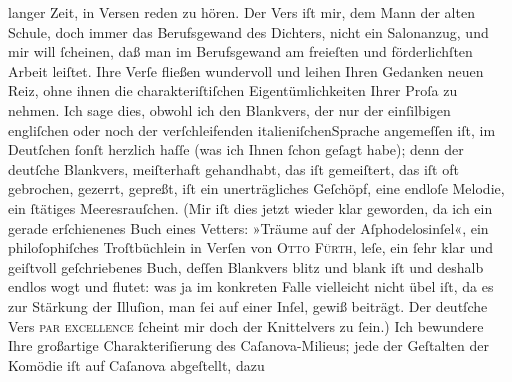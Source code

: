 \begin{ledgroupsized}[t]{13cm}
               langer Zeit, in Versen reden zu hören. Der Vers iſt mir, dem Mann der alten Schule,
               doch immer das Berufsgewand des Dichters, nicht ein Salonanzug, und mir will
               ſcheinen, daß man im Berufsgewand am freieſten und förderlichſten Arbeit leiſtet.
               Ihre Verſe fließen wundervoll und leihen Ihren Gedanken neuen Reiz, ohne ihnen die
               charakteriſtiſchen Eigentümlichkeiten Ihrer Proſa zu nehmen. Ich sage dies, obwohl
               ich den Blankvers, der nur der einſilbigen engliſchen oder noch der verſchleifenden italieniſchenSprache angemeſſen iſt, im Deutſchen ſonſt herzlich
               haſſe (was ich Ihnen ſchon geſagt habe); denn der deutſche Blankvers, mei{\pb}ſterhaft gehandhabt, das iſt gemeiſtert,
               das iſt oft gebrochen, gezerrt, gepreßt, iſt ein unerträgliches Geſchöpf, eine
               endloſe Melodie, ein ſtätiges Meeresrauſchen. (Mir iſt dies jetzt wieder klar
               geworden, da ich ein gerade erſchienenes Buch eines Vetters: »Träume auf der Aſphodelosinſel«, ein philoſophiſches
               Troſtbüchlein in Verſen von \textsc{Otto Fürth}, leſe, ein ſehr klar und geiſtvoll geſchriebenes Buch, deſſen Blankvers blitz
               und blank iſt und deshalb endlos wogt und flutet: was ja im konkreten Falle
               vielleicht nicht übel iſt, da es zur Stärkung der Illuſion, man ſei auf einer Inſel,
               gewiß beiträgt. Der deutſche Vers \textsc{par excellence}{ }ſcheint mir doch der Knittelvers zu ſein.)\pend
           \pstart
           Ich bewundere Ihre großartige Charakteriſierung des Caſanova-Milieus; jede der Geſtalten der Komödie iſt auf
                  Caſanova abgeſtellt, dazu

\end{ledgroupsized}
